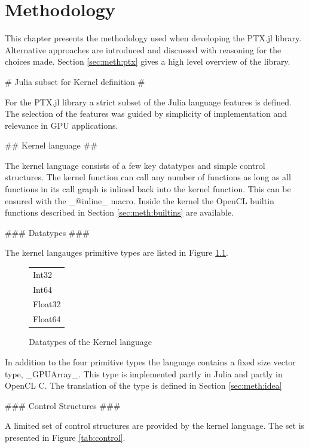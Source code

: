 \chapter{Methodology}
\label{sec:meth}
\begin{markdown}

This chapter presents the methodology used when developing the PTX.jl
library. Alternative approaches are introduced and discussed with
reasoning for the choices made. Section \ref{sec:meth:ptx} gives a
high level overview of the library.

# Julia subset for Kernel definition #

For the PTX.jl library a strict subset of the Julia language features
is defined. The selection of the features was guided by simplicity
of implementation and relevance in GPU applications.

## Kernel language ##
\label{sec:meth:kernel}

The kernel language consists of a few key datatypes and simple control
structures. The kernel function can call any number of functions as
long as all functions in its call graph is inlined back into the
kernel function. This can be ensured with the _@inline_ macro. Inside
the kernel the OpenCL builtin functions described in Section
\ref{sec:meth:builtins} are available.

### Datatypes ###

The kernel langauges primitive types are listed in Figure \ref{tab:datatypes}.

\begin{figure}[H]
  \centering
  \begin{tabular}{|l|}
  \hline
  Int32\\
  Int64\\
  Float32\\
  Float64\\
  \hline
  \end{tabular}
  \caption{Datatypes of the Kernel language}
  \label{tab:datatypes}
\end{figure}

In addition to the four primitive types the language contains a fixed
size vector type, _GPUArray_. This type is implemented partly in Julia
and partly in OpenCL C. The translation of the type is defined in
Section \ref{sec:meth:idea}

### Control Structures ###

A limited set of control structures are provided by the kernel
language. The set is presented in Figure \ref{tab:control}.


\end{markdown}
